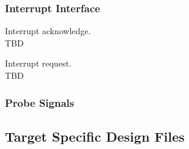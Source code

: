 \subsubsection{Interrupt Interface}
\label{integration:if:irq}

\begin{description}[style=nextline]

\item[\texttt{irq\_ack\_o}] Interrupt acknowledge. \\
  TBD

\item[\texttt{irq\_req\_i}] Interrupt request. \\
  TBD

\end{description}

\subsubsection{Probe Signals}
\label{integration:if:prb}








\subsection{Target Specific Design Files}
\label{integration:ifs}




